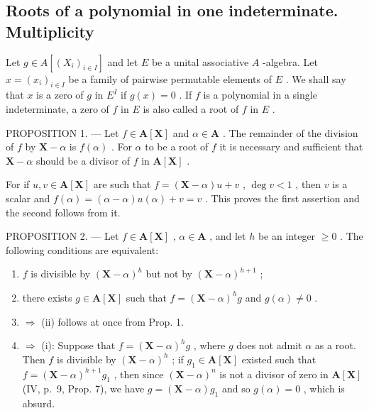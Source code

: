 \subsection{Roots of a polynomial in one indeterminate. Multiplicity}

Let \(g \in A[(X_i)_{i \in I}]\) and let \(E\) be a unital associative \(A\) -algebra. Let \(x = (x_i)_{i \in I}\) be a family of pairwise permutable elements of \(E\) . We shall say that \(x\) is a zero of \(g\) in \(E^{I}\) if \(g(x) = 0\) . If \(f\) is a polynomial in a single indeterminate, a zero of \(f\) in \(E\) is also called a root of \(f\) in \(E\) .

PROPOSITION 1. --- Let \(f \in \mathbf{A}[\mathbf{X}]\) and \(\alpha \in \mathbf{A}\) . The remainder of the division of \(f\) by \(\mathbf{X} - \alpha\) is \(f(\alpha)\) . For \(\alpha\) to be a root of \(f\) it is necessary and sufficient that \(\mathbf{X} - \alpha\) should be a divisor of \(f\) in \(\mathbf{A}[\mathbf{X}]\) .

For if \(u, v \in \mathbf{A}[\mathbf{X}]\) are such that \(f = (\mathbf{X} - \alpha)u + v\) , \(\deg v < 1\) , then \(v\) is a scalar and \(f(\alpha) = (\alpha - \alpha)u(\alpha) + v = v\) . This proves the first assertion and the second follows from it.

PROPOSITION 2. --- Let \(f \in \mathbf{A}[\mathbf{X}]\) , \(\alpha \in \mathbf{A}\) , and let \(h\) be an integer \(\geqslant 0\) . The following conditions are equivalent:

\begin{enumerate}
\def\labelenumi{(\roman{enumi})}
\item
  \(f\) is divisible by \((\mathbf{X} - \alpha)^h\) but not by \((\mathbf{X} - \alpha)^{h + 1}\) ;
\item
  there exists \(g \in \mathbf{A}[\mathbf{X}]\) such that \(f = (\mathbf{X} - \alpha)^h g\) and \(g(\alpha) \neq 0\) .
\item
  \(\Rightarrow\) (ii) follows at once from Prop. 1.
\item
  \(\Rightarrow\) (i): Suppose that \(f = (\mathbf{X} - \alpha)^h g\) , where \(g\) does not admit \(\alpha\) as a root. Then \(f\) is divisible by \((\mathbf{X} - \alpha)^h\) ; if \(g_1 \in \mathbf{A}[\mathbf{X}]\) existed such that \(f = (\mathbf{X} - \alpha)^{h + 1}g_1\) , then since \((\mathbf{X} - \alpha)^n\) is not a divisor of zero in \(\mathbf{A}[\mathbf{X}]\) (IV, p.~9, Prop. 7), we have \(g = (\mathbf{X} - \alpha)g_1\) and so \(g(\alpha) = 0\) , which is absurd.
\end{enumerate}

